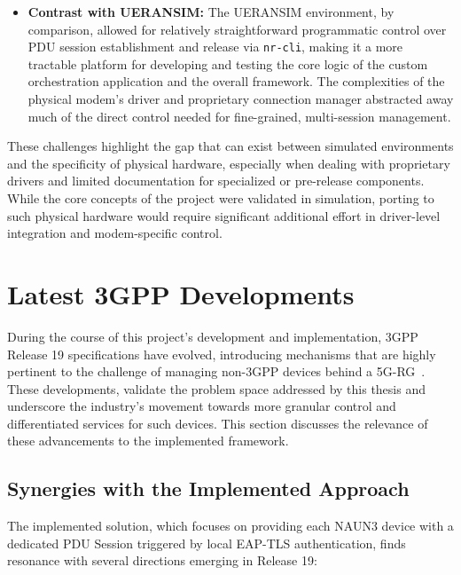 \begin{itemize}
    \item \textbf{Contrast with UERANSIM:} The UERANSIM environment, by comparison, allowed for relatively straightforward programmatic control over \ac{PDU} session establishment and release via \texttt{nr-cli}, making it a more tractable platform for developing and testing the core logic of the custom orchestration application and the overall framework. The complexities of the physical modem's driver and proprietary connection manager abstracted away much of the direct control needed for fine-grained, multi-session management.
\end{itemize}

These challenges highlight the gap that can exist between simulated environments and the specificity of physical hardware, especially when dealing with proprietary drivers and limited documentation for specialized or pre-release components. While the core concepts of the project were validated in simulation, porting to such physical hardware would require significant additional effort in driver-level integration and modem-specific control.

\section{Latest \acs{3GPP} Developments}

During the course of this project's development and implementation, \ac{3GPP} Release 19 specifications have evolved, introducing mechanisms that are highly pertinent to the challenge of managing non-\ac{3GPP} devices behind a \ac{5G-RG}~\cite{23.316-p29}. These developments, validate the problem space addressed by this thesis and underscore the industry's movement towards more granular control and differentiated services for such devices. This section discusses the relevance of these advancements to the implemented framework.

\subsection{Synergies with the Implemented Approach}

The implemented solution, which focuses on providing each \ac{NAUN3} device with a dedicated \ac{PDU} Session triggered by local \ac{EAP-TLS} authentication, finds resonance with several directions emerging in Release 19:

